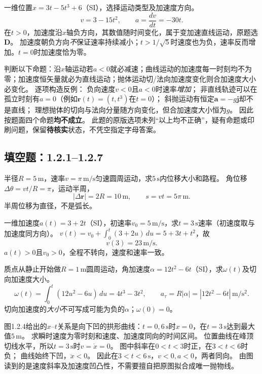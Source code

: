 \problemtext 一维位置$x=3t-5t^3+6$（SI），选择运动类型及加速度方向。
\workings
\[
 v=3-15t^2,\qquad a=\frac{dv}{dt}=-30t.
\]
在$t>0$，加速度沿$x$轴负方向，其数值随时间变化，属于变加速直线运动，原题选\textbf{D}。
\crosscheck 加速度朝负方向\emph{不}保证速率持续减小；$t>1/\sqrt5$时速度也为负，速率反而增加。$t=0$时加速度恰为零。

\problemtext 判断以下命题：沿$x$轴运动若$a<0$就必减速；曲线运动的加速度每一时刻均不为零；加速度恒矢量就必为直线运动；抛体运动切/法向加速度变化则合加速度大小必变化。
\workings
逐项构造反例：
负向速度$v<0$且$a<0$时速率\emph{增加}；
非直线轨迹可以在孤立时刻有$a=0$（例如$\bm r(t)=(t,t^3)$在$t=0$）；
斜抛运动有恒定$\bm a=-g\bm j$却不是直线；
理想抛体的切向与法向分量随方向变化，但合加速度大小恒为$g$。
因此按题面四个命题\textbf{均不成立}。
\crosscheck 此题的原版选项未列“以上均不正确”，疑有命题或印刷问题，保留\textbf{待核实}状态，不凭空指定字母答案。

\subsection{填空题：1.2.1--1.2.7}
\problemtext 半径$R=5\,\mathrm m$，速率$v=\pi\,\mathrm{m/s}$匀速圆周运动，求$5\,\mathrm s$内位移大小和路程。
\workings
角位移$\Delta\theta=vt/R=\pi$，运动半周，
\[
 \boxed{|\Delta\bm r|=2R=10\,\mathrm m,\qquad
 s=vt=5\pi\,\mathrm m}.
\]
\crosscheck 半周位移为直径，不是弧长。

\problemtext 一维加速度$a(t)=3+2t$（SI），初速率$v_0=5\,\mathrm{m/s}$，求$t=3\,\mathrm s$速率（初速度取与加速度同方向）。
\workings
$v(t)=v_0+\int_0^t(3+2u)\,du=5+3t+t^2$，故
\[
\boxed{v(3)=23\,\mathrm{m/s}}.
\]
\crosscheck $a(t)>0$且$v_0>0$，全程不转向，速度和速率一致。

\problemtext 质点从静止开始做$R=1\,\mathrm m$圆周运动，角加速度$\alpha=12t^2-6t$（SI），求$\omega(t)$及切向加速度大小。
\workings
\[
 \omega(t)=\int_0^t(12u^2-6u)\,du
 =4t^3-3t^2,\qquad
 \boxed{a_\tau=R|\alpha|=|12t^2-6t|\,\mathrm{m/s^2}}.
\]
\crosscheck 切向加速度的\emph{大小}不可写成可能为负的$\alpha$；$\omega(0)=0$。

\problemtext 图1.2.4给出的$x$--$t$关系是向下凹的拱形曲线：$t=0,6\,\mathrm s$时$x=0$，在$t=3\,\mathrm s$达到最大值$5\,\mathrm m$。
求瞬时速度为零时刻和速度、加速度同向的时间区间。
\workings
位置曲线在峰顶切线水平，所以$\boxed{t=3\,\mathrm s}$时$v=\dot x=0$。
图中斜率在$0<t<3$时正，在$3<t<6$时负；
曲线始终下凹，$\ddot x<0$。
因此在$\boxed{3<t<6\,\mathrm s}$，$v<0,a<0$，两者同向。
\crosscheck 由图读到的是速度斜率及加速度凹凸性，不需要擅自把原图拟合成唯一抛物线。

